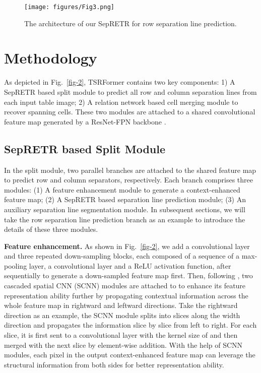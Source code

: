 \documentclass[sigconf]{acmart}
\begin{document}
\begin{figure*}[t]
    \centering
    \texttt{[image: figures/Fig3.png]}
    \caption{The architecture of our SepRETR for row separation line prediction.}
    \label{fig-3}
\end{figure*}

\section{Methodology}
 As depicted in Fig.~\ref{fig-2}, TSRFormer contains two key components: 1) A SepRETR based split module to predict all row and column separation lines from each input table image; 2) A relation network based cell merging module to recover spanning cells. These two modules are attached to a shared convolutional feature map  generated by a ResNet-FPN backbone \cite{resnet,fpn2017}.
 
\subsection{SepRETR based Split Module}
In the split module, two parallel branches are attached to the shared feature map  to predict row and column separators, respectively. Each branch comprises three modules: (1) A feature enhancement module to generate a context-enhanced feature map; (2) A SepRETR based separation line prediction module; (3) An auxiliary separation line segmentation module. In subsequent sections, we will take the row separation line prediction branch as an example to introduce the details of these three modules.

\textbf{Feature enhancement.} As shown in Fig.~\ref{fig-2}, we add a  convolutional layer and three repeated down-sampling blocks, each composed of a sequence of a  max-pooling layer, a  convolutional layer and a ReLU activation function, after  sequentially to generate a down-sampled feature map  first. Then, following \cite{ma2022robust}, two cascaded spatial CNN (SCNN) \cite{spatialcnn} modules are attached to  to enhance its feature representation ability further by propagating contextual information across the whole feature map in rightward and leftward directions. Take the rightward direction as an example, the SCNN module splits  into  slices along the width direction and propagates the information slice by slice from left to right. For each slice, it is first sent to a convolutional layer with the kernel size of  and then merged with the next slice by element-wise addition. With the help of SCNN modules, each pixel in the output context-enhanced feature map  can leverage the structural information from both sides for better representation ability.
\end{document}
